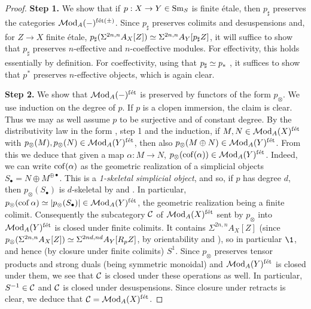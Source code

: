\documentclass{amsart}
\numberwithin{proposition}{section}
\numberwithin{equation}{section}
\def\fet{\mathrm{f\acute et}}
\begin{document}
\begin{proof}
\textbf{Step 1.} We show that if $p: X \to Y \in {\mathrm{S}\mathrm{m}}_S$ is finite étale, then $p_\sharp$ preserves the categories $\Mod_A(\ph)^{\fet(\pm)}$.
Since $p_\sharp$ preserves colimits and desuspensions and, for $Z \to X$ finite étale, $p_\sharp(\Sigma^{2n,n} A_X[Z]) \simeq \Sigma^{2n,n}A_Y[p_\sharp Z]$, it will suffice to show that $p_\sharp$ preserves $n$-effective and $n$-coeffective modules.
For effectivity, this holds essentially by definition.
For coeffectivity, using that $p_\sharp \simeq p_*$ \cite[Theorem~2.4.50(2), (3)]{triangulated-mixed-motives}, it suffices to show that $p^*$ preserves $n$-effective objects, which is again clear.

\textbf{Step 2.} We show that $\Mod_A(\ph)^\fet$ is preserved by functors of the form $p_\otimes$.
We use induction on the degree of $p$.
If $p$ is a clopen immersion, the claim is clear.
Thus we may as well assume $p$ to be surjective and of constant degree.
By the distributivity law in the form \cite[Corollary 5.13]{bachmann-norms}, step 1 and the induction, if $M, N \in \Mod_A(X)^\fet$ with $p_\otimes(M), p_\otimes(N) \in \Mod_A(Y)^\fet$, then also $p_\otimes(M \oplus N) \in \Mod_A(Y)^\fet$.
From this we deduce that given a map $\alpha: M \to N$, $p_\otimes(\cof(\alpha)) \in \Mod_A(Y)^\fet$.
Indeed, we can write $\operatorname{cof}(\alpha)$ as the geometric realization of a simplicial objects $S_\bullet = N \oplus M^{\oplus \bullet}$.
This is a \emph{1-skeletal simplicial object}, and so, if $p$ has degree $d$, then $p_\otimes(S_\bullet)$ is $d$-skeletal by \cite[Corollary 5.26]{bachmann-norms} and \cite[Proposition 2.10]{k-theory-and-poly-functors}.
In particular, $p_\otimes(\cof \alpha) \wequi |p_\otimes(S_\bullet)| \in \Mod_A(Y)^\fet$, the geometric realization being a finite colimit.
Consequently the subcategory $\mathcal C$ of $\Mod_A(X)^\fet$ sent by $p_\otimes$ into $\Mod_A(Y)^\fet$ is closed under finite colimits.
It contains $\Sigma^{2n,n}A_X[Z]$ (since $p_\otimes(\Sigma^{2n,n}A_X[Z]) \simeq \Sigma^{2nd,nd}A_Y[R_p Z]$, by orientability and \cite[Remark 4.9]{bachmann-norms}), so in particular $\1$, and hence (by closure under finite colimits) $S^1$.
Since $p_\otimes$ preserves tensor products and strong duals (being symmetric monoidal) and $\Mod_A(Y)^\fet$ is closed under them, we see that $\mathcal C$ is closed under these operations as well.
In particular, $S^{-1} \in \mathcal C$ and $\mathcal C$ is closed under desuspensions.
Since closure under retracts is clear, we deduce that $\scr C = \Mod_A(X)^\fet$.


\end{proof}
\end{document}
